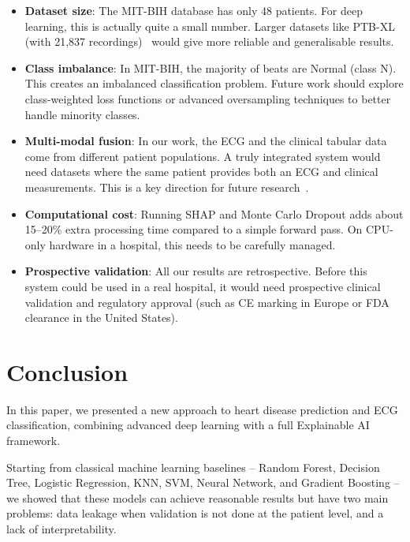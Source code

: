 \documentclass[10pt, twocolumn]{article}
\begin{document}
\begin{itemize}[leftmargin=*]
  \item \textbf{Dataset size}: The MIT-BIH database has only 48 patients. For deep learning,
        this is actually quite a small number. Larger datasets like PTB-XL (with 21,837
        recordings)~\cite{wagner2020} would give more reliable and generalisable results.
  \item \textbf{Class imbalance}: In MIT-BIH, the majority of beats are Normal (class N).
        This creates an imbalanced classification problem. Future work should explore
        class-weighted loss functions or advanced oversampling techniques to better handle
        minority classes.
  \item \textbf{Multi-modal fusion}: In our work, the ECG and the clinical tabular data
        come from different patient populations. A truly integrated system would need
        datasets where the same patient provides both an ECG and clinical measurements.
        This is a key direction for future research~\cite{alfaidil2022}.
  \item \textbf{Computational cost}: Running SHAP and Monte Carlo Dropout adds about
        15--20\% extra processing time compared to a simple forward pass. On CPU-only
        hardware in a hospital, this needs to be carefully managed.
  \item \textbf{Prospective validation}: All our results are retrospective. Before this
        system could be used in a real hospital, it would need prospective clinical
        validation and regulatory approval (such as CE marking in Europe or FDA clearance
        in the United States).
\end{itemize}

\section{Conclusion}

In this paper, we presented a new approach to heart disease prediction and ECG classification,
combining advanced deep learning with a full Explainable AI framework.

Starting from classical machine learning baselines -- Random Forest, Decision Tree, Logistic
Regression, KNN, SVM, Neural Network, and Gradient Boosting -- we showed that these models
can achieve reasonable results but have two main problems: data leakage when validation is
not done at the patient level, and a lack of interpretability.
\end{document}

